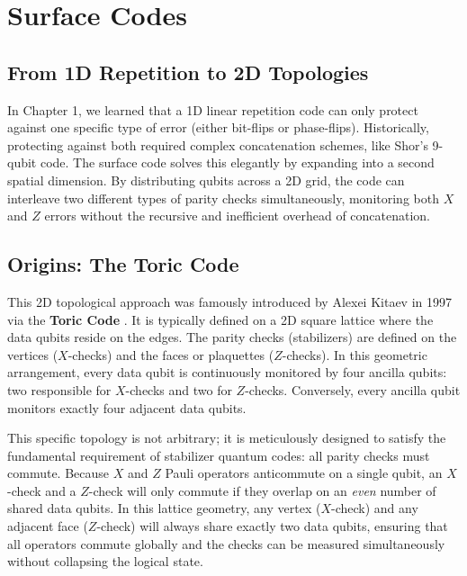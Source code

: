 \section{Surface Codes}

\subsection{From 1D Repetition to 2D Topologies}
In Chapter 1, we learned that a 1D linear repetition code can only protect against one specific type of error (either bit-flips or phase-flips). Historically, protecting against both required complex concatenation schemes, like Shor's 9-qubit code. The surface code solves this elegantly by expanding into a second spatial dimension. By distributing qubits across a 2D grid, the code can interleave two different types of parity checks simultaneously, monitoring both $X$ and $Z$ errors without the recursive and inefficient overhead of concatenation.

\subsection{Origins: The Toric Code}
This 2D topological approach was famously introduced by Alexei Kitaev in 1997 via the \textbf{Toric Code} \cite{kitaev2003fault}. It is typically defined on a 2D square lattice where the data qubits reside on the edges. The parity checks (stabilizers) are defined on the vertices ($X$-checks) and the faces or plaquettes ($Z$-checks). In this geometric arrangement, every data qubit is continuously monitored by four ancilla qubits: two responsible for $X$-checks and two for $Z$-checks. Conversely, every ancilla qubit monitors exactly four adjacent data qubits.

This specific topology is not arbitrary; it is meticulously designed to satisfy the fundamental requirement of stabilizer quantum codes: all parity checks must commute. Because $X$ and $Z$ Pauli operators anticommute on a single qubit, an $X$-check and a $Z$-check will only commute if they overlap on an \textit{even} number of shared data qubits. In this lattice geometry, any vertex ($X$-check) and any adjacent face ($Z$-check) will always share exactly two data qubits, ensuring that all operators commute globally and the checks can be measured simultaneously without collapsing the logical state.

